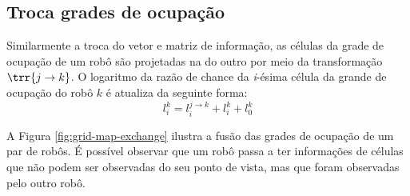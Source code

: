 \subsection{Troca grades de ocupação}
Similarmente a troca do vetor e matriz de informação, as células da 
grade de ocupação de um robô são projetadas na do outro por meio da 
transformação $\trr{j \to k}$. O logaritmo da razão de chance da \textit{i}-ésima célula da grande de ocupação do robô $k$ é atualiza da 
seguinte forma:
\begin{equation}
  l_i^k = l_i^{j\to k} + l_i^k + l_0^k
\end{equation}

A Figura \ref{fig:grid-map-exchange} ilustra a fusão das grades de 
ocupação de um par de robôs. É possível observar que um robô passa a ter 
informações de células que não podem ser observadas do seu ponto de 
vista, mas que foram observadas pelo outro robô.

